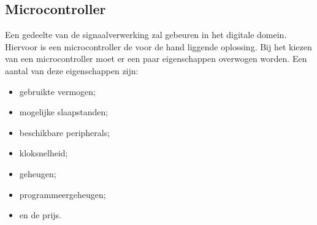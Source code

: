 \subsection{Microcontroller}
Een gedeelte van de signaalverwerking zal gebeuren in het digitale domein. Hiervoor is een microcontroller de voor de hand liggende oplossing. Bij het kiezen van een microcontroller moet er een paar eigenschappen overwogen worden. Een aantal van deze eigenschappen zijn:
\begin{itemize}
    \item gebruikte vermogen;
    \item mogelijke slaapstanden;
    \item beschikbare peripherals;
    \item kloksnelheid;
    \item geheugen;
    \item programmeergeheugen;
    \item en de prijs.
\end{itemize}

